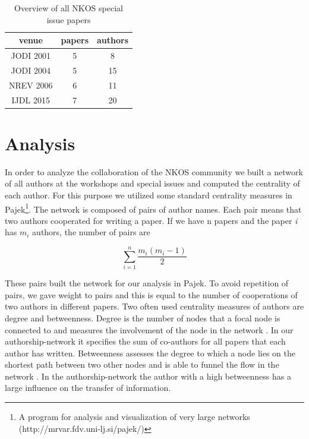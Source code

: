 \documentclass[runningheads,a4paper]{llncs}
\begin{document}
\begin{table}
	\centering
	\caption{Overview of all NKOS special issue papers}
\begin{tabular}{|c|c|c|}  
	\hline 
	venue& papers  & authors  \\ 
	\hline 
	JODI 2001 \cite{Hill2001} & 5 & 8 \\ 
	\hline 
	JODI 2004 \cite{Tudhope2004} & 5 & 15 \\ 
	\hline 
	NREV 2006 \cite{Tudhope2006} & 6 & 11 \\ 
	\hline 
	IJDL 2015 \cite{Mayr2016} & 7 &  20\\ 
	\hline 
\end{tabular} 
\label{tab:SI}
\end{table}



\section{Analysis}\label{analysis}

In order to analyze the collaboration of the NKOS community we built a network of all authors at the workshops and special issues and computed the centrality of each author. For this purpose we utilized some standard centrality measures in Pajek\footnote{A program for analysis and visualization of very large networks (http://mrvar.fdv.uni-lj.si/pajek/)}. The network is composed of pairs of author names. Each pair means that two authors cooperated for writing a paper. If we have n papers and the paper \textit{i} has $m_i$ authors, the number of pairs are 

\begin{equation}\sum\limits_{i=1}^n \frac{m_i(m_i-1)}{2}\end{equation}

These pairs built the network for our analysis in Pajek. To avoid repetition of pairs, we gave weight to pairs and this is equal to the number of cooperations of two authors in different papers. 
Two often used centrality measures of authors are degree and betweenness. Degree is the number of nodes that a focal node is connected to and measures the involvement of the node in the network \cite{Opsahl2010}. In our authorship-network it specifies the sum of co-authors for all papers that each author has written. Betweenness assesses the degree to which a node lies on the shortest path between two other nodes and is able to funnel the flow in the network \cite{Opsahl2010}. In the authorship-network the author with a high betweenness has a large influence on the transfer of information. 
\end{document}
